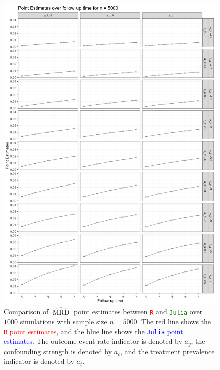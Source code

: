 \documentclass[pdflatex,sn-vancouver-ay]{sn-jnl}%
\theoremstyle{thmstyleone}%
\theoremstyle{thmstyletwo}%
\theoremstyle{thmstylethree}%
\newcommand{\Rlang}{\texttt{R}}
\newcommand{\julia}{\texttt{Julia}}
\begin{document}
\begin{appendices}
\begin{figure}[H]
\centering
\includegraphics[height=0.95\textheight]{plots/plots_PE5000.png}
\caption{Comparison of $\widehat{\operatorname{MRD}}$ point estimates between \textcolor{red}{\Rlang{}} and \textcolor{green}{\julia{}} over $1000$ simulations with sample size $n = 5000$. The red line shows the \textcolor{red}{\Rlang{} point estimates}, and the blue line shows the \textcolor{blue}{\julia{} point estimates}. The outcome event rate indicator is denoted by $a_y$, the confounding strength is denoted by $a_c$, and the treatment prevalence indicator is denoted by $a_t$.}
\label{plt:PE5000}
\end{figure}

\newpage


\end{appendices}
\end{document}
